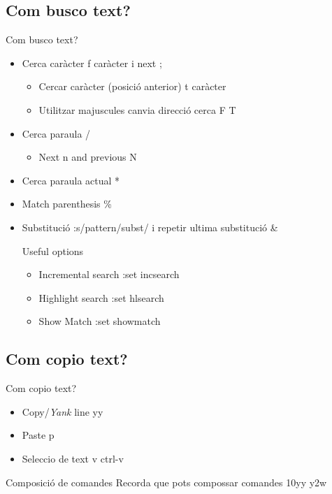 \documentclass{beamer}
\begin{document}
    \subsection{Com busco text?}
    \begin{frame}{Com busco text?}
        \begin{itemize}
            \item Cerca caràcter \alert{f caràcter} i next \alert{;}
                \begin{itemize}
                    \item Cercar caràcter (posició anterior) \alert{t caràcter}
                    \item Utilitzar majuscules canvia direcció cerca \alert{F T}
                \end{itemize}
            \item Cerca paraula \alert{/}
                \begin{itemize}
                    \item Next \alert{n} and previous \alert{N}
                \end{itemize}
            \item Cerca paraula actual \alert{*}
            \item Match parenthesis \alert{\%}
            \item Substitució \alert{:s/pattern/subst/} i repetir ultima substitució \alert{\&}
            \begin{alertblock}{Useful options}
                \begin{itemize}
                    \item Incremental search \alert{:set incsearch}
                    \item Highlight search \alert{:set hlsearch}
                    \item Show Match \alert{:set showmatch}
                \end{itemize}
            \end{alertblock}
        \end{itemize}
    \end{frame}

    \subsection{Com copio text?}
    \begin{frame}{Com copio text?}
        \begin{itemize}
            \item Copy/\emph{Yank} line \alert{yy}
            \item Paste \alert{p}
            \item Seleccio de text \alert{v} \alert{ctrl-v}
        \end{itemize}
            \begin{alertblock}{Composició de comandes}
                Recorda que pots compossar comandes \alert{10yy y2w}
            \end{alertblock}
    \end{frame}
\end{document}
